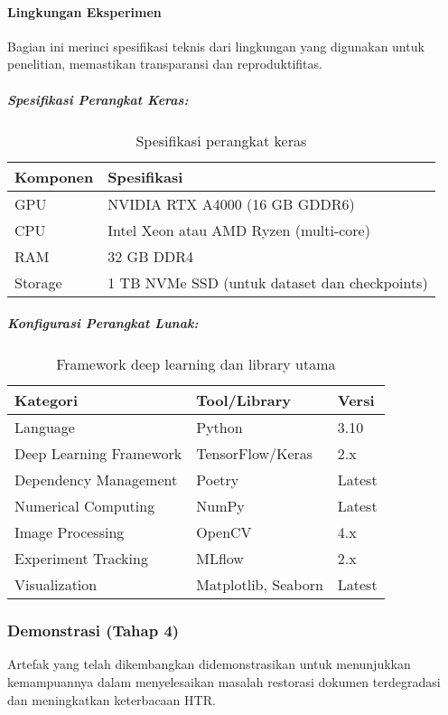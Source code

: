 \documentclass[12pt,a4paper]{article}
\begin{document}
\paragraph{Lingkungan Eksperimen}
Bagian ini merinci spesifikasi teknis dari lingkungan yang digunakan untuk penelitian, memastikan transparansi dan reproduktifitas.

\subparagraph{Spesifikasi Perangkat Keras:}
\begin{table}[H]
\centering
\caption{Spesifikasi perangkat keras}
\label{tab:hardware-spec}
\small
\begin{tabular}{|l|l|}
\hline
\textbf{Komponen} & \textbf{Spesifikasi} \\ \hline
GPU & NVIDIA RTX A4000 (16 GB GDDR6) \\ \hline
CPU & Intel Xeon atau AMD Ryzen (multi-core) \\ \hline
RAM & 32 GB DDR4 \\ \hline
Storage & 1 TB NVMe SSD (untuk dataset dan checkpoints) \\ \hline
\end{tabular}
\end{table}

\subparagraph{Konfigurasi Perangkat Lunak:}
\begin{table}[H]
\centering
\caption{Framework deep learning dan library utama}
\label{tab:software-framework}
\small
\begin{tabular}{|l|l|l|}
\hline
\textbf{Kategori} & \textbf{Tool/Library} & \textbf{Versi} \\ \hline
Language & Python & 3.10 \\ \hline
Deep Learning Framework & TensorFlow/Keras & 2.x \\ \hline
Dependency Management & Poetry & Latest \\ \hline
Numerical Computing & NumPy & Latest \\ \hline
Image Processing & OpenCV & 4.x \\ \hline
Experiment Tracking & MLflow & 2.x \\ \hline
Visualization & Matplotlib, Seaborn & Latest \\ \hline
\end{tabular}
\end{table}

\subsubsection{Demonstrasi (Tahap 4)}
Artefak yang telah dikembangkan didemonstrasikan untuk menunjukkan kemampuannya dalam menyelesaikan masalah restorasi dokumen terdegradasi dan meningkatkan keterbacaan HTR.
\end{document}
